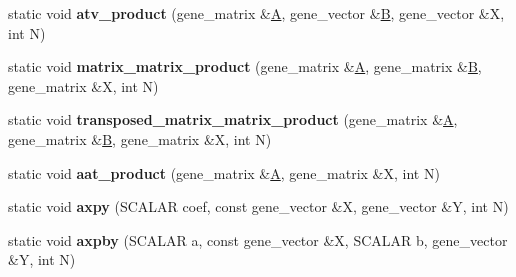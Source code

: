 \begin{DoxyCompactItemize}
\item 
\mbox{\label{classblas__interface_3_01_s_c_a_l_a_r_01_4_ae879d7cef6a168a8bb27f3c36d7e12db}} 
static void {\bfseries atv\+\_\+product} (gene\+\_\+matrix \&\hyperlink{group___core___module_class_eigen_1_1_matrix}{A}, gene\+\_\+vector \&\hyperlink{group___core___module_class_eigen_1_1_matrix}{B}, gene\+\_\+vector \&X, int N)
\item 
\mbox{\label{classblas__interface_3_01_s_c_a_l_a_r_01_4_a5f551c01fee2369ca01cf3f8d4716540}} 
static void {\bfseries matrix\+\_\+matrix\+\_\+product} (gene\+\_\+matrix \&\hyperlink{group___core___module_class_eigen_1_1_matrix}{A}, gene\+\_\+matrix \&\hyperlink{group___core___module_class_eigen_1_1_matrix}{B}, gene\+\_\+matrix \&X, int N)
\item 
\mbox{\label{classblas__interface_3_01_s_c_a_l_a_r_01_4_ab8057556e744cbe8f5da222e8be464a6}} 
static void {\bfseries transposed\+\_\+matrix\+\_\+matrix\+\_\+product} (gene\+\_\+matrix \&\hyperlink{group___core___module_class_eigen_1_1_matrix}{A}, gene\+\_\+matrix \&\hyperlink{group___core___module_class_eigen_1_1_matrix}{B}, gene\+\_\+matrix \&X, int N)
\item 
\mbox{\label{classblas__interface_3_01_s_c_a_l_a_r_01_4_a41eb9130a7271f2fce9e392b766211e4}} 
static void {\bfseries aat\+\_\+product} (gene\+\_\+matrix \&\hyperlink{group___core___module_class_eigen_1_1_matrix}{A}, gene\+\_\+matrix \&X, int N)
\item 
\mbox{\label{classblas__interface_3_01_s_c_a_l_a_r_01_4_a94ca3be1c2f513fb860997124461c434}} 
static void {\bfseries axpy} (S\+C\+A\+L\+AR coef, const gene\+\_\+vector \&X, gene\+\_\+vector \&Y, int N)
\item 
\mbox{\label{classblas__interface_3_01_s_c_a_l_a_r_01_4_a584063eb94416a3d5c58921e52a09584}} 
static void {\bfseries axpby} (S\+C\+A\+L\+AR a, const gene\+\_\+vector \&X, S\+C\+A\+L\+AR b, gene\+\_\+vector \&Y, int N)
\item 
\mbox{\label{classblas__interface_3_01_s_c_a_l_a_r_01_4_ac5bb21b4ec1ae490963c029b3d140bc6}} 

\end{DoxyCompactItemize}
